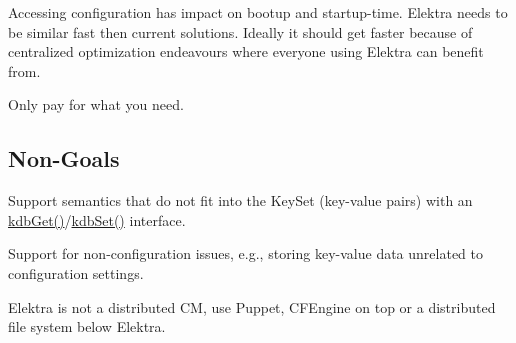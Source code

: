 Accessing configuration has impact on bootup and startup-\/time. Elektra needs to be similar fast then current solutions. Ideally it should get faster because of centralized optimization endeavours where everyone using Elektra can benefit from.

Only pay for what you need.

\subsection*{Non-\/\+Goals}


\begin{DoxyItemize}
\item Support semantics that do not fit into the Key\+Set (key-\/value pairs) with an {\ttfamily \hyperlink{group__kdb_ga28e385fd9cb7ccfe0b2f1ed2f62453a1}{kdb\+Get()}}/{\ttfamily \hyperlink{group__kdb_ga11436b058408f83d303ca5e996832bcf}{kdb\+Set()}} interface.
\item Support for non-\/configuration issues, e.\+g., storing key-\/value data unrelated to configuration settings.
\item Elektra is not a distributed CM, use Puppet, C\+F\+Engine on top or a distributed file system below Elektra. 
\end{DoxyItemize}